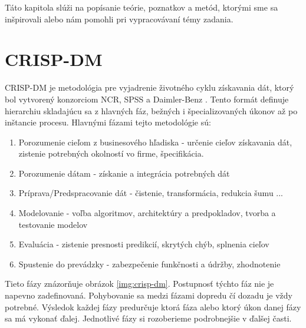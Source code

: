 Táto kapitola slúži na popísanie teórie, poznatkov a metód, ktorými sme sa inšpirovali alebo nám pomohli pri vypracovávaní témy zadania.
\section{CRISP-DM}
CRISP-DM \cite{crisp-dm} je metodológia pre vyjadrenie životného cyklu získavania dát, ktorý bol vytvorený konzorciom NCR, SPSS a Daimler-Benz \cite{handbook}. Tento formát definuje hierarchiu skladajúcu sa z hlavných fáz, bežných i špecializovaných úkonov až po inštancie procesu. Hlavnými fázami tejto metodológie sú:\par
\begin{enumerate}
  \item Porozumenie cieľom z businesového hľadiska - určenie cieľov získavania dát, zistenie potrebných okolností vo firme, špecifikácia.
  \item Porozumenie dátam - získanie a integrácia potrebných dát
  \item Príprava/Predspracovanie dát - čistenie, transformácia, redukcia šumu ...
  \item Modelovanie - voľba algoritmov, architektúry a predpokladov, tvorba a testovanie modelov
  \item Evaluácia - zistenie presnosti predikcií, skrytých chýb, splnenia cieľov
  \item Spustenie do prevádzky - zabezpečenie funkčnosti a údržby, zhodnotenie
\end{enumerate}
Tieto fázy znázorňuje obrázok \ref{img:crisp-dm}. Postupnosť týchto fáz nie je napevno zadefinovaná. Pohybovanie sa medzi fázami dopredu čí dozadu je vždy potrebné. Výsledok každej fázy predurčuje ktorá fáza alebo ktorý úkon danej fázy sa má vykonať ďalej. Jednotlivé fázy si rozoberieme podrobnejšie v ďalšej časti.
